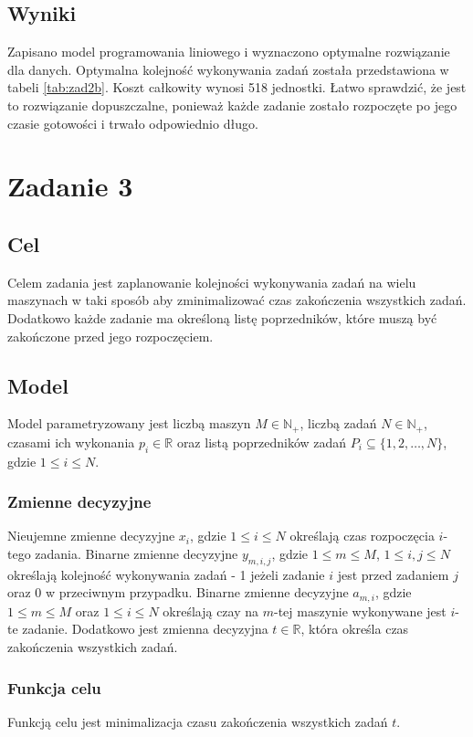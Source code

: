 \documentclass{article}
\begin{document}
\subsection{Wyniki}
Zapisano model programowania liniowego i wyznaczono optymalne rozwiązanie dla danych.
Optymalna kolejność wykonywania zadań została przedstawiona w tabeli \ref{tab:zad2b}.
Koszt całkowity wynosi 518 jednostki. Łatwo sprawdzić, że jest to rozwiązanie dopuszczalne, ponieważ każde zadanie zostało rozpoczęte po jego czasie gotowości i trwało odpowiednio długo.

\section{Zadanie 3}
\subsection{Cel}
Celem zadania jest zaplanowanie kolejności wykonywania zadań na wielu maszynach w taki sposób aby zminimalizować czas zakończenia wszystkich zadań. Dodatkowo każde zadanie ma określoną listę poprzedników, które muszą być zakończone przed jego rozpoczęciem.

\subsection{Model}
Model parametryzowany jest liczbą maszyn $M \in \mathbb{N}_+$, liczbą zadań $N \in \mathbb{N}_+$, czasami ich wykonania $p_i \in \mathbb{R}$ oraz listą poprzedników zadań $P_i \subseteq \{1,2,\ldots,N\}$, gdzie $1 \leq i \leq N$.

\subsubsection{Zmienne decyzyjne}
Nieujemne zmienne decyzyjne $x_i$, gdzie $1 \leq i \leq N$ określają czas rozpoczęcia $i$-tego zadania. 
Binarne zmienne decyzyjne $y_{m,i,j}$, gdzie $1 \leq m \leq M$, $1 \leq i,j \leq N$ określają kolejność wykonywania zadań - 1 jeżeli zadanie $i$ jest przed zadaniem $j$ oraz 0 w przeciwnym przypadku.
Binarne zmienne decyzyjne $a_{m,i}$, gdzie $1 \leq m \leq M$ oraz $1 \leq i \leq N$ określają czay na $m$-tej maszynie wykonywane jest $i$-te zadanie.
Dodatkowo jest zmienna decyzyjna $t \in \mathbb{R}$, która określa czas zakończenia wszystkich zadań.

\subsubsection{Funkcja celu}
Funkcją celu jest minimalizacja czasu zakończenia wszystkich zadań $t$.
\end{document}
